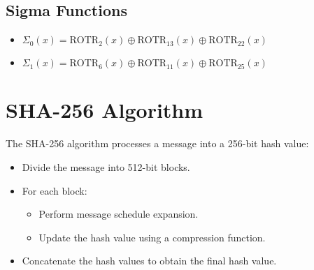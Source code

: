 \documentclass[11pt]{article}
\begin{document}
\subsection*{Sigma Functions}

\begin{itemize}
    \item $\Sigma_0(x) = \text{ROTR}_2(x) \oplus \text{ROTR}_{13}(x) \oplus \text{ROTR}_{22}(x)$
    \item $\Sigma_1(x) = \text{ROTR}_6(x) \oplus \text{ROTR}_{11}(x) \oplus \text{ROTR}_{25}(x)$
\end{itemize}

\section*{SHA-256 Algorithm}

The SHA-256 algorithm processes a message into a 256-bit hash value:

\begin{itemize}
    \item Divide the message into 512-bit blocks.
    \item For each block:
    \begin{itemize}
        \item Perform message schedule expansion.
        \item Update the hash value using a compression function.
    \end{itemize}
    \item Concatenate the hash values to obtain the final hash value.
\end{itemize}
\end{document}
